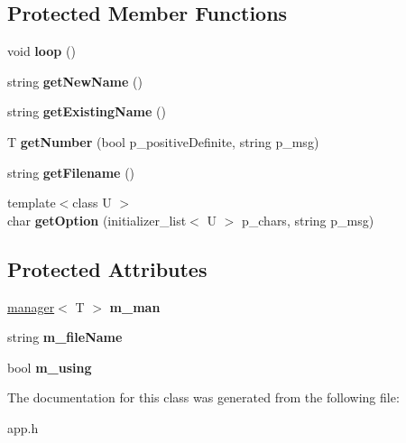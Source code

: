 \subsection*{Protected Member Functions}
\begin{DoxyCompactItemize}
\item 
\hypertarget{classpolygons_1_1app_ad8953bfb86943eb52851971a786d0bf8}{void {\bfseries loop} ()}\label{classpolygons_1_1app_ad8953bfb86943eb52851971a786d0bf8}

\item 
\hypertarget{classpolygons_1_1app_a54b9b363ea71f6a0df9936a5498e05d5}{string {\bfseries get\-New\-Name} ()}\label{classpolygons_1_1app_a54b9b363ea71f6a0df9936a5498e05d5}

\item 
\hypertarget{classpolygons_1_1app_a685b0431705cfa698fbcf15112694a36}{string {\bfseries get\-Existing\-Name} ()}\label{classpolygons_1_1app_a685b0431705cfa698fbcf15112694a36}

\item 
\hypertarget{classpolygons_1_1app_a4f9da856aa9944fa104fd63ff86feb40}{T {\bfseries get\-Number} (bool p\-\_\-positive\-Definite, string p\-\_\-msg)}\label{classpolygons_1_1app_a4f9da856aa9944fa104fd63ff86feb40}

\item 
\hypertarget{classpolygons_1_1app_ab7bed478ee5edd256e1bc6c5ecb34fc1}{string {\bfseries get\-Filename} ()}\label{classpolygons_1_1app_ab7bed478ee5edd256e1bc6c5ecb34fc1}

\item 
\hypertarget{classpolygons_1_1app_a2e559bc56e3dc8aecc344ddfe6a15388}{{\footnotesize template$<$class U $>$ }\\char {\bfseries get\-Option} (initializer\-\_\-list$<$ U $>$ p\-\_\-chars, string p\-\_\-msg)}\label{classpolygons_1_1app_a2e559bc56e3dc8aecc344ddfe6a15388}

\end{DoxyCompactItemize}
\subsection*{Protected Attributes}
\begin{DoxyCompactItemize}
\item 
\hypertarget{classpolygons_1_1app_a9a23bbc7fcd63799c4519c13616285f7}{\hyperlink{classpolygons_1_1manager}{manager}$<$ T $>$ {\bfseries m\-\_\-man}}\label{classpolygons_1_1app_a9a23bbc7fcd63799c4519c13616285f7}

\item 
\hypertarget{classpolygons_1_1app_a0ed33f611d56816f2cad442968e73c8b}{string {\bfseries m\-\_\-file\-Name}}\label{classpolygons_1_1app_a0ed33f611d56816f2cad442968e73c8b}

\item 
\hypertarget{classpolygons_1_1app_a19a74b237359a316270424bac4a82065}{bool {\bfseries m\-\_\-using}}\label{classpolygons_1_1app_a19a74b237359a316270424bac4a82065}

\end{DoxyCompactItemize}


The documentation for this class was generated from the following file\-:\begin{DoxyCompactItemize}
\item 
app.\-h\end{DoxyCompactItemize}
